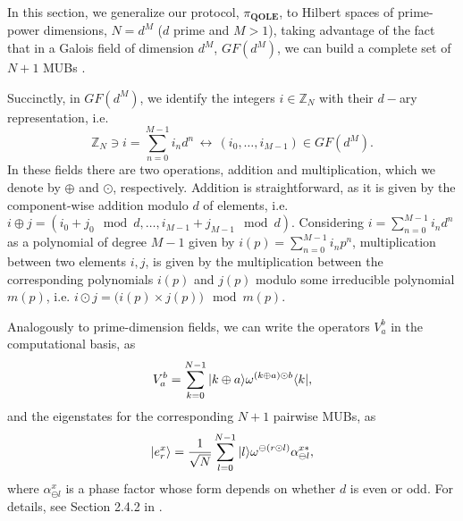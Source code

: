In this section, we generalize our protocol, $\pi_{\textbf{QOLE}}$, to Hilbert spaces of prime-power dimensions, $N=d^M$ ($d$ prime and $M>1$), taking advantage  of the fact that in a Galois field of dimension $d^M$, $GF(d^M)$, we can build a complete set of $N + 1$ MUBs \cite{DEBZ10}.

Succinctly, in $GF(d^M)$, we identify the integers $i\in\mathbb{Z}_N$ with their $d-$ary representation, i.e.
$$\mathbb{Z}_N \ni i = \sum^{M-1}_{n=0} i_n d^n \, \longleftrightarrow \, (i_0, \dots , i_{M-1}) \in GF(d^M).$$
In these fields there are  two operations, addition and multiplication, which we denote by $\oplus$ and $\odot$, respectively. Addition  is straightforward, as it is given by the component-wise addition modulo $d$ of elements, i.e. $i\oplus j = (i_0 + j_0 \mod d, \dots , i_{M-1} + j_{M-1} \mod d)$.  Considering $i = \sum^{M-1}_{n=0} i_n d^n $ as a polynomial of degree $M-1$ given by $i(p) = \sum^{M-1}_{n=0} i_n p^n$,  multiplication between two elements $i, j$, is given by the multiplication between the corresponding polynomials $i(p)$ and $j(p)$ modulo some irreducible polynomial $m(p)$, i.e. $i\odot j = \big(i(p)\times j(p)\big) \mod m(p)$. 

Analogously to prime-dimension fields, we can write the operators $V_a^b$ in the computational basis, as  \begin{equation*}
    V^b_a = \sum_{k=0}^{N-1} | k \oplus a \rangle \omega^{(k \oplus a)\odot b} \langle k |,
\end{equation*}
and the eigenstates for the corresponding $N+1$ pairwise MUBs, as 
\begin{equation*}
    | e^x_r \rangle = \frac{1}{\sqrt{N}} \sum_{l=0}^{N-1}| l \rangle \omega^{\ominus(r \odot l)} \alpha^{x*}_{\ominus l},
\end{equation*}
where $\alpha^{x}_{\ominus l}$ is a phase factor whose form depends on whether $d$ is even or odd. For details, see Section 2.4.2 in \cite{DEBZ10}.

